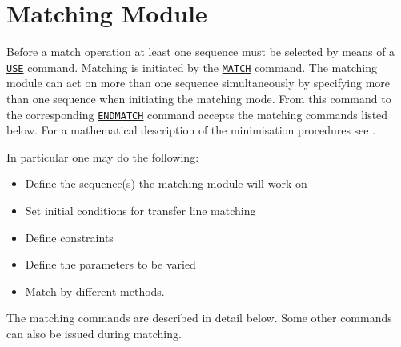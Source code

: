  
\chapter{Matching Module}
\label{chap:match}

Before a match operation at least one sequence must be selected by means
of a \hyperref[sec:use]{\tt USE} command. Matching is 
initiated by the \hyperref[sec:match]{\tt MATCH} command. The matching
module can act on more than one sequence simultaneously by  specifying
more than one sequence when initiating the matching mode.  
From this command to the corresponding
\hyperref[sec:endmatch]{\tt ENDMATCH} command \madx accepts the
matching commands listed below. For a mathematical description of the
minimisation procedures see \cite{MINUIT}. 

In particular one may do the following: 
\begin{itemize}
 \item Define the sequence(s) the matching module will work on 
 \item Set initial conditions for transfer line matching 
 \item Define constraints 
 \item Define the parameters to be varied 
 \item Match by different methods. 
\end{itemize}

The matching commands are described in detail below. Some other commands
can also be issued during matching.  

